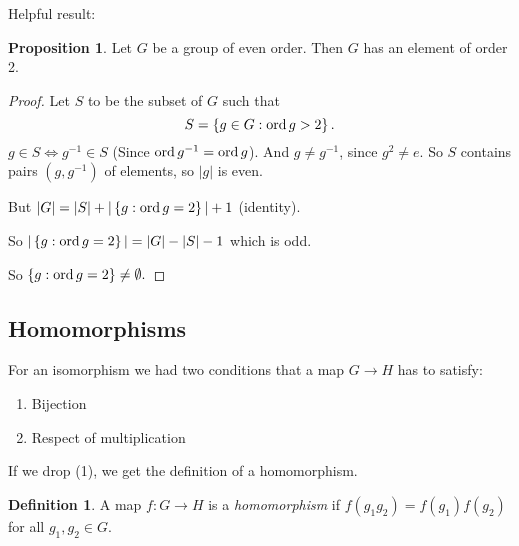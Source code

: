 \documentclass{article}
\theoremstyle{definition} \newtheorem*{definition}{Definition}
\newtheorem{proposition}[theorem]{Proposition}
\begin{document}
Helpful result: \begin{proposition} Let $G$ be a group of even order. Then $G$
  has an element of order 2.  \end{proposition}

\begin{proof} Let $S$ to be the subset of $G$ such that \begin{equation*} S =
    \left\{ g \in G : \operatorname{\text{ord}} g > 2 \right\}.  \end{equation*} $g \in S \iff
  g^{-1} \in S$ (Since $\operatorname{\text{ord}} g^{-1} = \operatorname{\text{ord}} g$). And $g \neq g^{-1}$, since $g^2
  \neq e$. So $S$ contains pairs $(g,g^{-1})$ of elements, so $|g|$ is even. 

  But $|G|=|S| + |\left\{ g : \operatorname{\text{ord}} g=2 \right\}| + 1$ (identity). 

  So $|\left\{ g : \operatorname{\text{ord}} g = 2 \right\}|=|G|-|S|-1$ which is odd. 

  So $\left\{ g : \operatorname{\text{ord}} g = 2 \right\} \neq \emptyset.$

\end{proof}


\subsection{Homomorphisms}

For an isomorphism we had two conditions that a map $G \rightarrow H$ has to
satisfy:

\begin{enumerate} \item Bijection \item Respect of multiplication
  \end{enumerate}

If we drop (1), we get the definition of a homomorphism.\\

\begin{definition} A map $f:G \rightarrow H$ is a \emph{homomorphism} if $f(g_1
  g_2)=f(g_1)f(g_2)$ for all $g_1,g_2 \in G.$\\ \end{definition}
\end{document}
